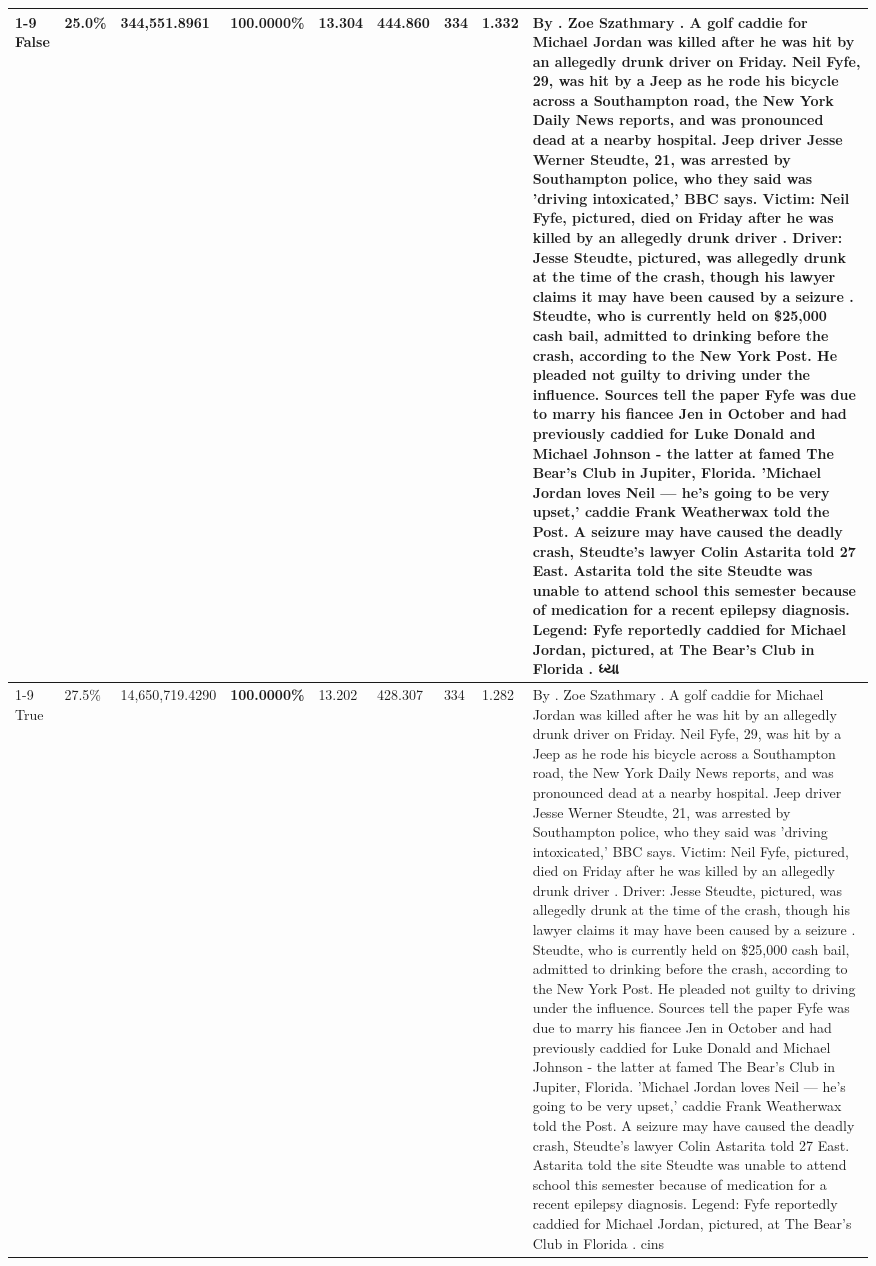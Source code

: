 \begin{table}[H]
\begin{tabular}{lllrlllll}
\cline{1-9}
False & 25.0\% & 344,551.8961 & \bfseries \color{red} 100.0000\% & 13.304 & 444.860 & 334 & 1.332 & By . Zoe Szathmary . A golf caddie for Michael Jordan was killed after he was hit by an allegedly drunk driver on Friday. Neil Fyfe, 29, was hit by a Jeep as he rode his bicycle across a Southampton road, the New York Daily News reports, and was pronounced dead at a nearby hospital. Jeep driver Jesse Werner Steudte, 21, was arrested by Southampton police, who they said was 'driving intoxicated,' BBC says. Victim: Neil Fyfe, pictured, died on Friday after he was killed by an allegedly drunk driver . Driver: Jesse Steudte, pictured, was allegedly drunk at the time of the crash, though his lawyer claims it may have been caused by a seizure . Steudte, who is currently held on \$25,000 cash bail, admitted to drinking before the crash, according to the New York Post. He pleaded not guilty to driving under the influence. Sources tell the paper Fyfe was due to marry his fiancee Jen in October and had previously caddied for Luke Donald and Michael Johnson - the latter at famed The Bear's Club in Jupiter, Florida. 'Michael Jordan loves Neil — he’s going to be very upset,' caddie Frank Weatherwax told the Post. A seizure may have caused the deadly crash, Steudte's lawyer Colin Astarita told 27 East. Astarita told the site Steudte was unable to attend school this semester because of medication for a recent epilepsy diagnosis. Legend: Fyfe reportedly caddied for Michael Jordan, pictured, at The Bear's Club in Florida . ધ્યા \\
\cline{1-9}
True & 27.5\% & 14,650,719.4290 & \bfseries \color{red} 100.0000\% & 13.202 & 428.307 & 334 & 1.282 & By . Zoe Szathmary . A golf caddie for Michael Jordan was killed after he was hit by an allegedly drunk driver on Friday. Neil Fyfe, 29, was hit by a Jeep as he rode his bicycle across a Southampton road, the New York Daily News reports, and was pronounced dead at a nearby hospital. Jeep driver Jesse Werner Steudte, 21, was arrested by Southampton police, who they said was 'driving intoxicated,' BBC says. Victim: Neil Fyfe, pictured, died on Friday after he was killed by an allegedly drunk driver . Driver: Jesse Steudte, pictured, was allegedly drunk at the time of the crash, though his lawyer claims it may have been caused by a seizure . Steudte, who is currently held on \$25,000 cash bail, admitted to drinking before the crash, according to the New York Post. He pleaded not guilty to driving under the influence. Sources tell the paper Fyfe was due to marry his fiancee Jen in October and had previously caddied for Luke Donald and Michael Johnson - the latter at famed The Bear's Club in Jupiter, Florida. 'Michael Jordan loves Neil — he’s going to be very upset,' caddie Frank Weatherwax told the Post. A seizure may have caused the deadly crash, Steudte's lawyer Colin Astarita told 27 East. Astarita told the site Steudte was unable to attend school this semester because of medication for a recent epilepsy diagnosis. Legend: Fyfe reportedly caddied for Michael Jordan, pictured, at The Bear's Club in Florida . cins \\

\end{tabular}
\end{table}
